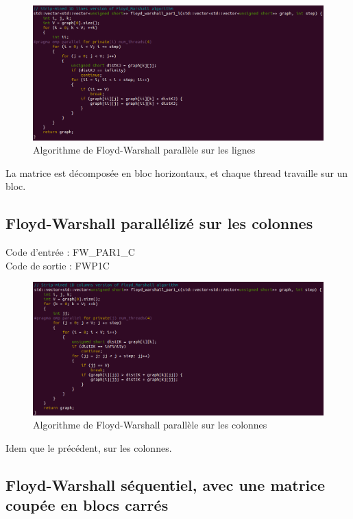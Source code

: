 \documentclass[a4paper,11pt]{article}
\begin{document}
\begin{figure}[H]
\begin{center}
  \includegraphics[scale=0.6]{FW_PAR1_L.png}
  \caption{Algorithme de Floyd-Warshall parallèle sur les lignes}
\end{center}
\end{figure}

La matrice est décomposée en bloc horizontaux, et chaque thread travaille sur un bloc.

\subsection{Floyd-Warshall parallélizé sur les colonnes}

\noindent Code d'entrée : FW\_PAR1\_C \\
Code de sortie : FWP1C

\begin{figure}[H]
\begin{center}
  \includegraphics[scale=0.6]{FW_PAR1_C.png}
  \caption{Algorithme de Floyd-Warshall parallèle sur les colonnes}
\end{center}
\end{figure}

Idem que le précédent, sur les colonnes.

\subsection{Floyd-Warshall séquentiel, avec une matrice coupée en blocs carrés}
\end{document}
